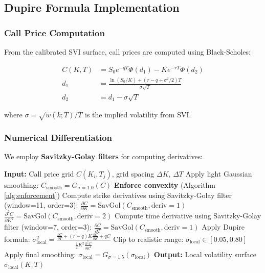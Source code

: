 \documentclass[12pt,a4paper]{article}
\begin{document}
\subsection{Dupire Formula Implementation}\label{sec:dupire_implementation}

\subsubsection{Call Price Computation}

From the calibrated SVI surface, call prices are computed using Black-Scholes:

\begin{align}
    C(K,T) &= S_0 e^{-qT}\Phi(d_1) - Ke^{-rT}\Phi(d_2) \\
    d_1 &= \frac{\ln(S_0/K) + (r - q + \sigma^2/2)T}{\sigma\sqrt{T}} \\
    d_2 &= d_1 - \sigma\sqrt{T}
\end{align}

where $\sigma = \sqrt{w(k;T)/T}$ is the implied volatility from SVI.

\subsubsection{Numerical Differentiation}

We employ \textbf{Savitzky-Golay filters} \cite{Savitzky1964} for computing derivatives:

\begin{algorithm}
\caption{Local Volatility Computation}
\begin{algorithmic}[1]
\STATE \textbf{Input:} Call price grid $C(K_i, T_j)$, grid spacing $\Delta K$, $\Delta T$
\STATE Apply light Gaussian smoothing: $C_{\text{smooth}} = G_{\sigma=1.0}(C)$
\STATE \textbf{Enforce convexity} (Algorithm \ref{alg:enforcement})
\STATE Compute strike derivatives using Savitzky-Golay filter (window=11, order=3):
\STATE \quad $\frac{\partial C}{\partial K} = \text{SavGol}(C_{\text{smooth}}, \text{deriv}=1)$
\STATE \quad $\frac{\partial^2 C}{\partial K^2} = \text{SavGol}(C_{\text{smooth}}, \text{deriv}=2)$
\STATE Compute time derivative using Savitzky-Golay filter (window=7, order=3):
\STATE \quad $\frac{\partial C}{\partial T} = \text{SavGol}(C_{\text{smooth}}, \text{deriv}=1)$
\STATE Apply Dupire formula: $\sigma_{\text{local}}^2 = \frac{\frac{\partial C}{\partial T} + (r-q)K\frac{\partial C}{\partial K} + qC}{\frac{1}{2}K^2\frac{\partial^2 C}{\partial K^2}}$
\STATE Clip to realistic range: $\sigma_{\text{local}} \in [0.05, 0.80]$\footnotemark
\STATE Apply final smoothing: $\sigma_{\text{local}} = G_{\sigma=1.5}(\sigma_{\text{local}})$
\STATE \textbf{Output:} Local volatility surface $\sigma_{\text{local}}(K,T)$
\end{algorithmic}
\end{algorithm}
\end{document}
